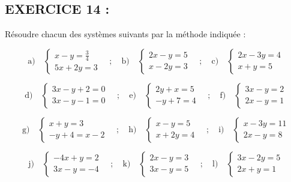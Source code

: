 \documentclass[12pt]{article}
\begin{document}
\subsection*{EXERCICE 14 :}
Résoudre chacun des systèmes suivants par la méthode indiquée :

\[
\text{a)} \quad 
\begin{cases}
x - y = \frac{3}{4} \\
5x + 2y = 3
\end{cases}
\quad ; \quad
\text{b)} \quad
\begin{cases}
2x - y = 5 \\
x - 2y = 3
\end{cases}
\quad ; \quad
\text{c)} \quad
\begin{cases}
2x - 3y = 4 \\
x + y = 5
\end{cases}
\]

\[
\text{d)} \quad
\begin{cases}
3x - y + 2 = 0 \\
3x - y - 1 = 0
\end{cases}
\quad ; \quad
\text{e)} \quad
\begin{cases}
2y + x = 5 \\
-y + 7 = 4
\end{cases}
\quad ; \quad
\text{f)} \quad
\begin{cases}
3x - y = 2 \\
2x - y = 1
\end{cases}
\]

\[
\text{g)} \quad
\begin{cases}
x + y = 3 \\
-y + 4 = x - 2
\end{cases}
\quad ; \quad
\text{h)} \quad
\begin{cases}
x - y = 5 \\
x + 2y = 4
\end{cases}
\quad ; \quad
\text{i)} \quad
\begin{cases}
x - 3y = 11 \\
2x - y = 8
\end{cases}
\]

\[
\text{j)} \quad
\begin{cases}
-4x + y = 2 \\
3x - y = -4
\end{cases}
\quad ; \quad
\text{k)} \quad
\begin{cases}
2x - y = 3 \\
3x - y = 5
\end{cases}
\quad ; \quad
\text{l)} \quad
\begin{cases}
3x - 2y = 5 \\
2x + y = 1
\end{cases}
\]
\end{document}
